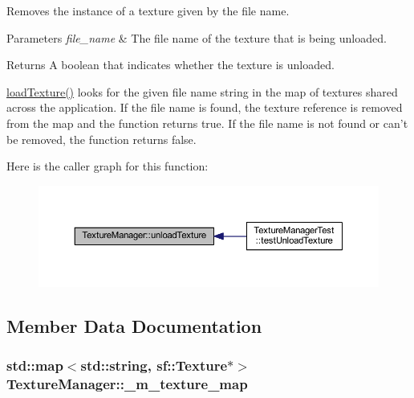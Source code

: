 Removes the instance of a texture given by the file name. 


\begin{DoxyParams}{Parameters}
{\em file\+\_\+name} & The file name of the texture that is being unloaded. \\
\hline
\end{DoxyParams}
\begin{DoxyReturn}{Returns}
A boolean that indicates whether the texture is unloaded.
\end{DoxyReturn}
\hyperlink{class_texture_manager_aa631660b783d448a29b1096c64fe65e4}{load\+Texture()} looks for the given file name string in the map of textures shared across the application. If the file name is found, the texture reference is removed from the map and the function returns true. If the file name is not found or can't be removed, the function returns false. 

Here is the caller graph for this function\+:
\nopagebreak
\begin{figure}[H]
\begin{center}
\leavevmode
\includegraphics[width=350pt]{class_texture_manager_a8a77e473313f9c07df6b76eafa5b5bd2_icgraph}
\end{center}
\end{figure}




\subsection{Member Data Documentation}
\hypertarget{class_texture_manager_a78bfaa7b400c1229762b49af63913752}{
\subsubsection[{\+\_\+m\+\_\+texture\+\_\+map}]{\setlength{\rightskip}{0pt plus 5cm}std\+::map$<$std\+::string, sf\+::\+Texture$\ast$$>$ Texture\+Manager\+::\+\_\+m\+\_\+texture\+\_\+map\hspace{0.3cm}{\ttfamily [private]}}}\label{class_texture_manager_a78bfaa7b400c1229762b49af63913752}


